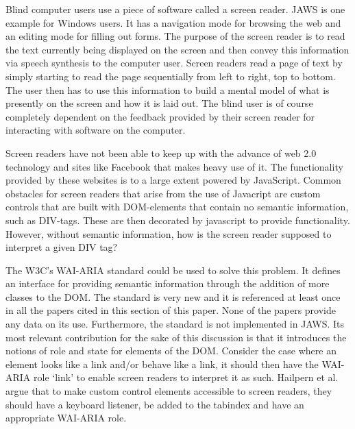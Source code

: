 \documentclass[conference]{IEEEtran}
\begin{document}
Blind computer users use a piece of software called a screen reader.
JAWS\cite{jaws} is one example for Windows users. It has a navigation mode for
browsing the web and an editing mode for filling out forms. The purpose of the
screen reader is to read the text currently being displayed on the screen and
then convey this information via speech synthesis to the computer user. Screen
readers read a page of text by simply starting to read the page sequentially
from left to right, top to bottom. The user then has to use this information to
build a mental model of what is presently on the screen and how it is laid out.
The blind user is of course completely dependent on the feedback provided by
their screen reader for interacting with software on the computer. 

Screen readers have not been able to keep up with the advance of web 2.0
technology and sites like Facebook that makes heavy use of it. The
functionality provided by these websites is to a large extent powered by
JavaScript. Common obstacles for screen readers that arise from the use of
Javacript are custom controls\cite{ariaprimer} that are built with DOM-elements
that contain no semantic information, such as DIV-tags. These are then
decorated by javascript to provide functionality.  However, without semantic
information, how is the screen reader supposed to interpret a given DIV tag?  

The W3C’s WAI-ARIA standard\cite{ariaspec} could be used to solve this
problem\cite{ariaprimer}.  It defines an interface for providing semantic
information through the addition of more classes to the DOM.  The standard is
very new and it is referenced at least once in all the papers cited in this
section of this paper. None of the papers provide any data on its use.
Furthermore, the standard  is not implemented in JAWS. Its most relevant
contribution for the sake of this discussion is that it introduces the notions
of role and state for elements of the DOM.  Consider the case where an element
looks like a link and/or behave like a link, it should then have the WAI-ARIA
role `link' to enable screen readers to interpret it as such.  Hailpern et
al\cite{hailpern2009}.  argue that to make custom control elements accessible
to screen readers, they should have a keyboard listener, be added to the
tabindex and have an appropriate WAI-ARIA role.
\end{document}
